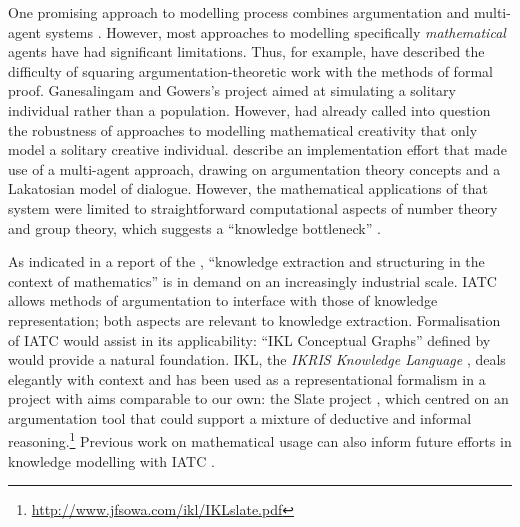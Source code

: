 \documentclass[smallextended,oneside]{svjour3}       %
\let\cite\citep
\newcommand\nothing[1]{#1}
\let\paragraph\nothing
\begin{document}
{One promising approach to modelling process combines argumentation and multi-agent
systems
\cite{modgil2007towards,maghraby2012automated,Robertson2012}.
However, most approaches to modelling specifically \emph{mathematical}
agents have had significant limitations.
%
Thus, for example, \citet{fiedler2007argumentation} have described the difficulty of
squaring argumentation-theoretic work with the methods of formal
proof.  Ganesalingam and Gowers's \citeyearpar{ganesalingam2016fully}
project aimed at simulating a solitary individual rather than a
population.  However, \citet{furse1990did} had already called into question the robustness of approaches to modelling mathematical creativity that only model a solitary creative individual.
\citet{pease2009bridging} describe an implementation effort
that made use of a multi-agent approach, drawing on argumentation
theory concepts and a Lakatosian model of dialogue.  However,
the mathematical applications of that system were limited to
straightforward computational aspects of number theory and group theory, which
suggests a ``knowledge bottleneck''
\cite{saint2016argument,moens2017argumentation}.

\paragraph{As indicated in a report of the \citet[p.~90]{national2014developing}, ``knowledge extraction and structuring in the context of mathematics'' is in demand on an increasingly industrial scale.}
IATC allows methods of argumentation to interface with those of
knowledge representation; both aspects are relevant to knowledge
extraction.  Formalisation of IATC would assist in its
applicability: ``IKL Conceptual Graphs'' defined by
\citet{sowa2008conceptual} would provide a natural foundation.  IKL,
the \emph{IKRIS Knowledge Language} \cite{hayes2006ikl,sowa2008conceptual},
deals elegantly with context and has been used as a representational
formalism in a project with aims comparable to our own: the Slate
project \cite{bringsjord2008slate}, which centred on an argumentation
tool that could support a mixture of deductive and informal
reasoning.\footnote{\url{http://www.jfsowa.com/ikl/IKLslate.pdf}}
Previous work on mathematical usage can also inform future efforts in
knowledge modelling with IATC \cite{trzeciak2012mathematical,wells2003handbook,
  wolska2015students,ginev2011structure}.  

}
\end{document}
